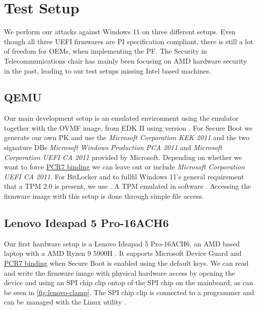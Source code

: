 
\chapter{Test Setup}
\label{sec:test-setup}

We perform our attacks against Windows 11 on three different setups.
Even though all three \ac{UEFI} firmwares are \ac{PI} specification compliant, there is still a lot of freedom for \acp{OEM}, when implementing the \ac{PF}.
The Security in Telecommunications chair has mainly been focusing on \ac{AMD} hardware security in the past, leading to our test setups missing Intel based machines.

\section{\acs{QEMU}}
\label{sec:test-setup:qemu}

Our main development setup is an emulated environment using the emulator  \cite{qemu} together with the \ac{OVMF} image, from \ac{EDK} II using version .
For Secure Boot we generate our own \ac{PK} and use the \emph{Microsoft Corporation \acs{KEK}  2011} and the two signature \acp{DB} \emph{Microsoft Windows Production PCA 2011} and \emph{Microsoft Corporation UEFI CA 2011} provided by Microsoft.
Depending on whether we want to force \hyperlink{pcr7-binding}{\ac{PCR}7 binding} we can leave out or include \emph{Microsoft Corporation UEFI CA 2011}.
For BitLocker and to fullfil Windows 11's general requirement that a \ac{TPM} 2.0 is present, we use .
A \ac{TPM} emulated in software \cite{swtpm}.
Accessing the firmware image with this setup is done through simple file access.

\section{Lenovo Ideapad 5 Pro-16ACH6}
\label{sec:test-setup:lenovo}

Our first hardware setup is a Lenovo Ideapad 5 Pro-16ACH6, an \ac{AMD} based laptop with a \ac{AMD} Ryzen 9 5900H \cite{lenovo-ideapad}.
It supports Microsoft Device Guard and \hyperlink{pcr7-binding}{\ac{PCR}7 binding} when Secure Boot is enabled using the default keys.
We can read and write the firmware image with physical hardware access by opening the device and using an \ac{SPI} chip clip ontop of the \ac{SPI} chip on the mainboard, as can be seen in \autoref{fig:lenovo-clamp}.
The \ac{SPI} chip clip is connected to a programmer and can be managed with the Linux utility .

